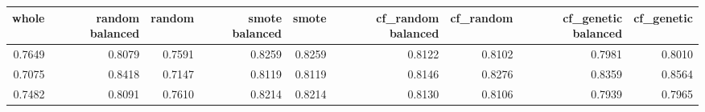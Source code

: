 \begin{tabular}{rrrrrrrrr}
\toprule

 whole &  random balanced &  random &  smote balanced &  smote &  cf\_random balanced &  cf\_random &  cf\_genetic balanced &  cf\_genetic \\
\midrule

0.7649 &           0.8079 &  0.7591 &          0.8259 & 0.8259 &              0.8122 &     0.8102 &               0.7981 &      0.8010 \\
0.7075 &           0.8418 &  0.7147 &          0.8119 & 0.8119 &              0.8146 &     0.8276 &               0.8359 &      0.8564 \\
0.7482 &           0.8091 &  0.7610 &          0.8214 & 0.8214 &              0.8130 &     0.8106 &               0.7939 &      0.7965 \\

\bottomrule
\end{tabular}
